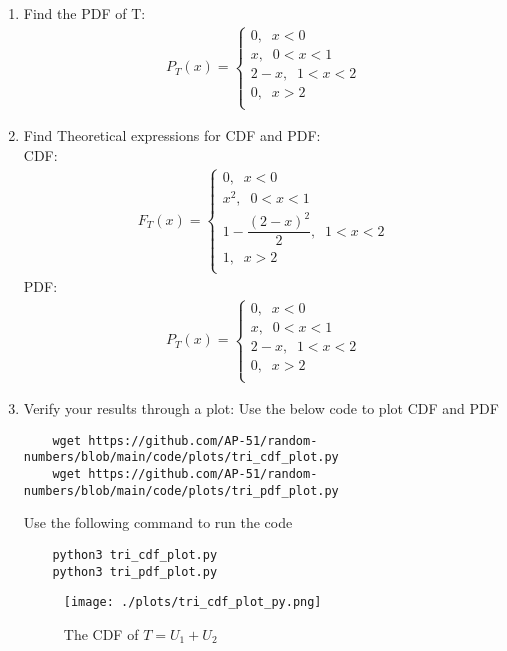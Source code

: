 \documentclass[journal,12pt,twocolumn]{IEEEtran}
\renewcommand\thesection{\arabic{section}}
\begin{document}
\begin{enumerate}[label=\thesection.\arabic*
,ref=\thesection.\theenumi]
\begin{align}
\begin{cases}
    0, \;\; x<0\\
    x^2, \;\; 0<x<1\\
    1-\dfrac{(2-x)^2}{2}, \;\; 1<x<2\\
    1, \;\; x>2\\
    \end{cases}     
\end{align}
\item Find the PDF of T:\\
\solution 
\begin{align}
    P_T(x)=
    \begin{cases}
    0, \;\; x<0\\
    x, \;\; 0<x<1\\
    2-x, \;\; 1<x<2\\
    0, \;\; x>2\\
    \end{cases}     
\end{align}
\item Find Theoretical expressions for CDF and PDF:\\
\solution CDF:
\begin{align}
    F_T(x)=
    \begin{cases}
    0, \;\; x<0\\
    x^2, \;\; 0<x<1\\
    1-\dfrac{(2-x)^2}{2}, \;\; 1<x<2\\
    1, \;\; x>2\\
    \end{cases}     
\end{align}
PDF:
\begin{align}
    P_T(x)=
    \begin{cases}
    0, \;\; x<0\\
    x, \;\; 0<x<1\\
    2-x, \;\; 1<x<2\\
    0, \;\; x>2\\
    \end{cases}     
\end{align}
\item Verify your results through a plot:
\solution Use the below code to plot CDF and PDF
\begin{lstlisting}
    wget https://github.com/AP-51/random-numbers/blob/main/code/plots/tri_cdf_plot.py
    wget https://github.com/AP-51/random-numbers/blob/main/code/plots/tri_pdf_plot.py
\end{lstlisting}
Use the following command to run the code
\begin{lstlisting}
    python3 tri_cdf_plot.py
    python3 tri_pdf_plot.py
\end{lstlisting}
\begin{figure}[h]
    \centering
    \texttt{[image: ./plots/tri\_cdf\_plot\_py.png]}
    \caption{The CDF of $T=U_1+U_2$}
    \label{fig:T_cdf}
    \end{figure}


\end{enumerate}
\end{document}
